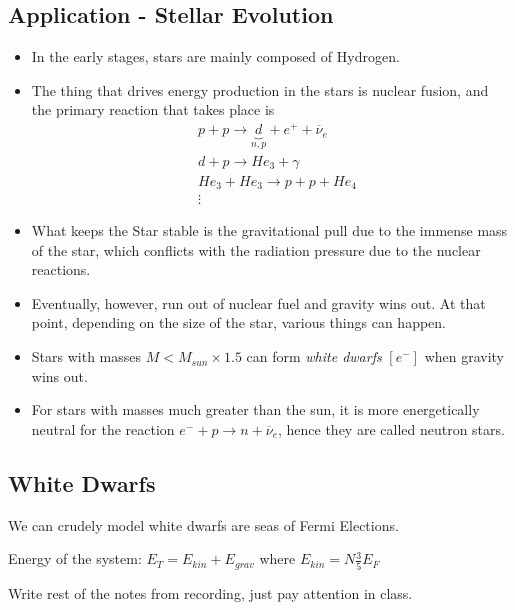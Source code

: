 \documentclass{article}
\begin{document}
\vskip 1cm
\subsection{Application - Stellar Evolution}
\begin{itemize}
  \item In the early stages, stars are mainly composed of Hydrogen. 
  \item The thing that drives energy production in the stars is nuclear fusion, and the primary reaction that takes place is 
  \begin{align*}
    &p + p \rightarrow \underbrace{d}_{n,p} + e^+ + \overline{\nu}_e \\
    &d + p \rightarrow He_3 + \gamma \\
    &He_3 + He_3 \rightarrow p + p + He_4 \\
    &\vdots
  \end{align*}
  \item What keeps the Star stable is the gravitational pull due to the immense mass of the star, which conflicts with the radiation pressure due to the nuclear reactions.
  \item Eventually, however,  run out of nuclear fuel and gravity wins out. At that point, depending on the size of the star, various things can happen.
  \item Stars with masses $M < M_{sun} \times 1.5$ can form \emph{white dwarfs} $[e^-]$ when gravity wins out.
  \item For stars with masses much greater than the sun, it is more energetically neutral for the reaction $e^- + p \rightarrow n + \overline{\nu}_e$, hence they are called neutron stars.
\end{itemize}

\subsection{White Dwarfs}
We can crudely model white dwarfs are seas of Fermi Elections. 

\vskip 0.5cm
Energy of the system: $E_T = E_{kin} + E_{grav}$ where $E_{kin} = N\frac{3}{5}E_F$

Write rest of the notes from recording, just pay attention in class.
\end{document}
